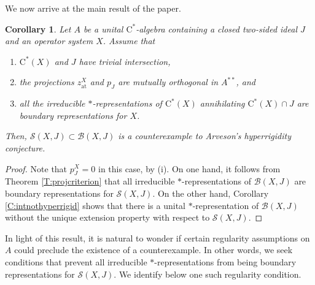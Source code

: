 \documentclass[10pt]{amsart}
\newcommand{\B}{{\mathcal{B}}}
\renewcommand{\S}{{\mathcal{S}}}
\newcommand{\rC}{\mathrm{C}}
\newcommand{\at}{\operatorname{at}}
\newtheorem{corollary}[lemma]{Corollary}
\theoremstyle{definition}
\begin{document}
We now arrive at the main result of the paper.

\begin{corollary}\label{C:counterex}
Let $A$ be a unital $\rC^*$-algebra containing a closed two-sided ideal $J$ and an operator system $X$.  Assume that 
\begin{enumerate}[{\rm (i)}]
\item $\rC^*(X)$ and $J$ have trivial intersection,
\item the projections $z^X_{\at}$ and $p_J$ are mutually orthogonal in $A^{**}$, and
\item all the irreducible $*$-representations of $\rC^*(X)$ annihilating $ \rC^*(X)\cap J$ are boundary representations for $X$.
\end{enumerate}
Then, $\S(X,J)\subset \B(X,J)$ is a counterexample to Arveson's hyperrigidity conjecture.
\end{corollary}
\begin{proof}
Note that $p_J^X=0$ in this case, by (i). On one hand, it follows from Theorem \ref{T:projcriterion} that all irreducible $*$-representations of $\B(X,J)$ are boundary representations for $\S(X,J)$. On the other hand, Corollary \ref{C:intnothyperrigid} shows that there is a unital $*$-representation of $\B(X,J)$ without the unique extension property with respect to $\S(X,J)$.
\end{proof}



In light of this result, it is natural to wonder if certain regularity assumptions on $A$ could preclude the existence of a counterexample. In other words, we seek conditions that prevent all irreducible $*$-representations from being boundary representations for $\S(X,J)$.  We identify below one such regularity condition.
\end{document}
